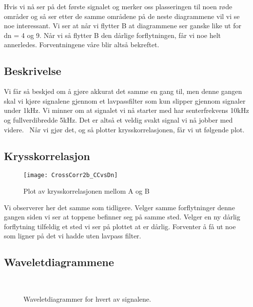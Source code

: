\documentclass[12pt,norsk,a4paper]{article}
\begin{document}
Hvis vi nå ser på det første signalet og merker oss plasseringen til noen røde områder og så ser etter de samme områdene på de neste diagrammene vil vi se noe interessant.
Vi ser at når vi flytter B at diagrammene ser ganske like ut for dn = 4 og 9. 
Når vi så flytter B den dårlige forflytningen, får vi noe helt annerledes.
Forventningene våre blir altså bekreftet.



\subsection{Beskrivelse}
Vi får så beskjed om å gjøre akkurat det samme en gang til, men denne gangen skal vi kjøre signalene gjennom et lavpassfilter som kun slipper gjennom signaler under 1kHz. Vi minner om at signalet vi nå starter med har senterfrekvens 10kHz og fullverdibredde 5kHz. Det er altså et veldig svakt signal vi nå jobber med videre. 
\
Når vi gjør det, og så plotter krysskorrelasjonen, får vi ut følgende plot.

\subsection{Krysskorrelasjon}
\begin{figure}[H]
\texttt{[image: CrossCorr2b\_CCvsDn]}\\
\caption{Plot av krysskorrelasjonen mellom A og B}
\end{figure}

Vi observerer her det samme som tidligere.
Velger samme forflytninger denne gangen siden vi ser at toppene befinner seg på samme sted.
Velger en ny dårlig forflytning tilfeldig et sted vi ser på plottet at er dårlig. Forventer å få ut noe som ligner på det vi hadde uten lavpass filter.

\subsection{Waveletdiagrammene}

\begin{figure}[H]
\begin{center}
\\ 
\noindent 
{}
\end{center}
\caption[caption]{Waveletdiagrammer for hvert av signalene.} 
\end{figure}
\end{document}
